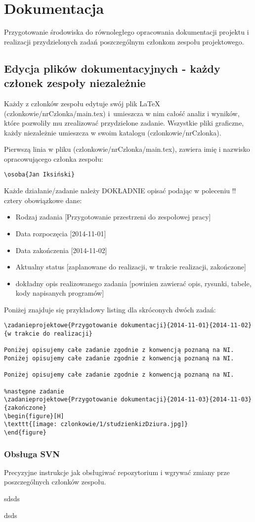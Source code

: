 \section{Dokumentacja}
Przygotowanie środowiska do równoległego opracowania dokumentacji projektu i realizacji przydzielonych zadań poszczególnym członkom zespołu projektowego.

\subsection[Edycja plików dokumentacyjnych]{Edycja plików dokumentacyjnych - każdy członek zespoły niezależnie}
Każdy z członków zespołu edytuje swój plik \LaTeX{} (czlonkowie/nrCzlonka/main.tex) i~umieszcza w nim całość analiz i wyników, które pozwoliły mu zrealizować przydzielone zadanie. Wszystkie pliki graficzne, każdy niezależnie umieszcza w swoim katalogu (czlonkowie/nrCzlonka).

Pierwszą linia w pliku (czlonkowie/nrCzlonka/main.tex), zawiera imię i nazwisko opracowującego członka zespołu:
\begin{lstlisting}
\osoba{Jan Iksiński}
\end{lstlisting}

Każde działanie/zadanie należy DOKŁADNIE opisać podając w poleceniu \s!\zadanieprojektowe! cztery obowiązkowe dane:
\begin{itemize}
\item Rodzaj zadania [Przygotowanie przestrzeni do zespołowej pracy]
\item Data rozpoczęcia [2014-11-01]
\item Data zakończenia [2014-11-02]
\item Aktualny status [zaplanowane do realizacji, w trakcie realizacji, zakończone]
\item dokładny opis realizowanego zadania [powinien zawierać opis, rysunki, tabele, kody napisanych programów]
\end{itemize}

Poniżej znajduje się przykładowy listing dla skróconych dwóch zadań:
\begin{lstlisting}
\zadanieprojektowe{Przygotowanie dokumentacji}{2014-11-01}{2014-11-02}{w trakcie do realizacji}

Poniżej opisujemy całe zadanie zgodnie z konwencją poznaną na NI.
Poniżej opisujemy całe zadanie zgodnie z konwencją poznaną na NI.

Poniżej opisujemy całe zadanie zgodnie z konwencją poznaną na NI. 

%następne zadanie
\zadanieprojektowe{Przygotowanie dokumentacji}{2014-11-03}{2014-11-03}{zakończone}
\begin{figure}[H]
\texttt{[image: czlonkowie/1/studzienkizDziura.jpg]}
\end{figure}
\end{lstlisting}


\subsubsection{Obsługa SVN}
Precyzyjne instrukcje jak obsługiwać repozytorium i wgrywać zmiany prze poszczególnych członków zespołu.



sdsds

dsds